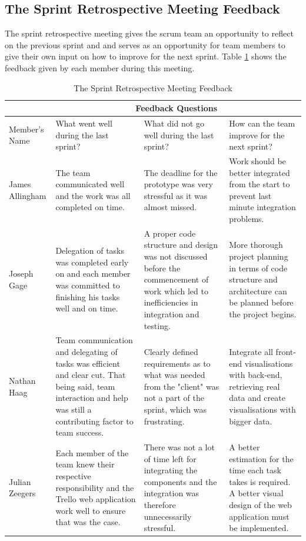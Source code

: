 \documentclass[12pt,onecolumn]{article}
\begin{document}
	\subsection{The Sprint Retrospective Meeting Feedback}
	The sprint retrospective meeting gives the scrum team an opportunity to reflect on the previous sprint and and serves as an opportunity for team members to give their own input on how to improve for the next sprint. Table \ref{feedback} shows the feedback given by each member during this meeting.
	
	\begin{table}[h!]
		\caption{The Sprint Retrospective Meeting Feedback\label{feedback}}
		\small
		\begin{tabular}{|>{\centering\arraybackslash}p{1.8cm}|p{3.4cm}|p{3.4cm}|p{3.4cm}|}
			\hline
			\multicolumn{1}{|c|}{}  &  \multicolumn{3}{c|}{Feedback Questions}  \\
			\hline
			Member's Name & What went well during the last sprint? & What did not go well during the last sprint? & How can the team improve for the next sprint? \\
			\hline
			James Allingham & The team communicated well and the work was all completed on time. & The deadline for the prototype was very stressful as it was almost missed. & Work should be better integrated from the start to prevent last minute integration problems. \\
			\hline
			Joseph Gage & Delegation of tasks was completed early on and each member was committed to finishing his tasks well and on time. & A proper code structure and design was not discussed before the commencement of work which led to inefficiencies in integration and testing. & More thorough project planning in terms of code structure and architecture can be planned before the project begins.\\
			\hline
			Nathan Haag & Team communication and delegating of tasks was efficient and clear cut. That being said, team interaction and help was still a contributing factor to team success. & Clearly defined requirements as to what was needed from the "client" was not a part of the sprint, which was frustrating. & Integrate all front-end visualisations with back-end, retrieving real data and create visualisations with bigger data. \\
			\hline
			Julian Zeegers & Each member of the team knew their respective responsibility and the Trello web application work well to ensure that was the case. & There was not a lot of time left for integrating the components and the integration was therefore unnecessarily stressful.   & A better estimation for the time each task takes is required. A better visual design of the web application must be implemented.\\
			\hline
			
			
		\end{tabular}
	\end{table}
	
\end{document}
